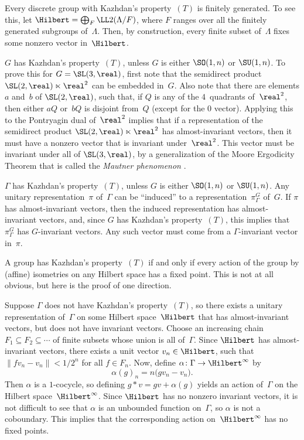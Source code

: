 \smallbreak

 Every discrete group with Kazhdan's property~$(T)$ is finitely generated. To see this, let $\Hilbert = \bigoplus_F \LL2(\Lambda/F)$, where $F$ ranges over all the finitely generated subgroups of~$\Lambda$. Then, by construction, every finite subset of~$\Lambda$ fixes some nonzero vector in~$\Hilbert$.

\smallbreak

 $G$ has Kazhdan's property~$(T)$, unless $G$ is either $\SO(1,n)$ or $\SU(1,n)$.
To prove this for $G = \SL(3,\real)$, first note that the semidirect product $\SL(2,\real) \ltimes \real^2$ can be embedded in~$G$. Also note that there are elements $a$ and~$b$ of $\SL(2,\real)$, such that, if $Q$ is any of the $4$~quadrants of~$\real^2$, then either $aQ$ or~$bQ$ is disjoint from~$Q$ (except for the $0$ vector). Applying this to the Pontryagin dual of~$\real^2$ implies that if a representation of the semidirect product $\SL(2,\real) \ltimes \real^2$ has almost-invariant vectors, then it must have a nonzero vector that is invariant under~$\real^2$. This vector must be invariant under all of $\SL(3,\real)$, by a generalization of the Moore Ergodicity Theorem that is called the \emph{Mautner phenomenon} .

\smallbreak

 $\Gamma$ has Kazhdan's property~$(T)$, unless $G$ is either $\SO(1,n)$ or $\SU(1,n)$. Any unitary representation~$\pi$ of~$\Gamma$ can be ``induced'' to a representation~$\pi_\Gamma^G$ of~$G$. If $\pi$ has almost-invariant vectors, then the induced representation has almost-invariant vectors, and, since $G$ has Kazhdan's property~$(T)$, this implies that $\pi_\Gamma^G$ has $G$-invariant vectors. Any such vector must come from a $\Gamma$-invariant vector in~$\pi$.

\smallbreak

 A group has Kazhdan's property~$(T)$ if and only if every action of the group by (affine) isometries on any Hilbert space has a fixed point. 
This is not at all obvious, but here is the proof of one direction. 

Suppose $\Gamma$ does not have Kazhdan's property~$(T)$, so there exists a unitary representation of~$\Gamma$ on some Hilbert space~$\Hilbert$ that has almost-invariant vectors, but does not have invariant vectors. 
Choose an increasing chain $F_1 \subseteq F_2 \subseteq \cdots$ of finite subsets whose union is all of~$\Gamma$. Since $\Hilbert$ has almost-invariant vectors, there exists a unit vector $v_n \in \Hilbert$, such that $\| f v_n - v_n\| < 1/2^n$ for all $f \in F_n$.
Now, define $\alpha \colon \Gamma \to \Hilbert^\infty$ by 
	$$ \alpha(g)_n = n\bigl( gv_n - v_n \bigr) .$$
Then $\alpha$ is a $1$-cocycle, so defining
	$ g * v = gv + \alpha(g)$
yields an action of~$\Gamma$ on the Hilbert space~$\Hilbert^\infty$. Since $\Hilbert$ has no nonzero invariant vectors, it is not difficult to see that $\alpha$ is an unbounded function on~$\Gamma$, so $\alpha$ is not a coboundary. This implies that the corresponding action on~$\Hilbert^\infty$ has no fixed points.




